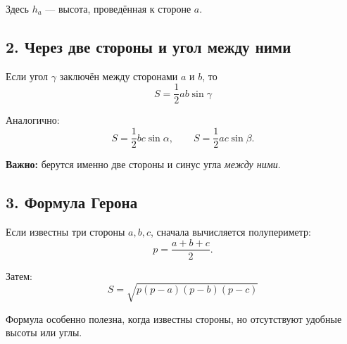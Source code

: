 \documentclass[a4paper,12pt]{article}
\newcommand{\key}[1]{\textcolor{darkaccent}{\textbf{#1}}}
\begin{document}
Здесь \(h_a\) --- высота, проведённая к стороне \(a\).

\begin{center}
\end{center}


\subsection*{2. Через две стороны и угол между ними}

Если угол \(\gamma\) заключён между сторонами \(a\) и \(b\), то
\[
\boxed{
S=\frac12 ab\sin\gamma
}
\]

Аналогично:
\[
S=\frac12 bc\sin\alpha,
\qquad
S=\frac12 ac\sin\beta.
\]

\key{Важно:} берутся именно две стороны и синус угла \emph{между ними}.


\subsection*{3. Формула Герона}

Если известны три стороны \(a,b,c\), сначала вычисляется полупериметр:
\[
p=\frac{a+b+c}{2}.
\]

Затем:
\[
\boxed{
S=\sqrt{p(p-a)(p-b)(p-c)}
}
\]

Формула особенно полезна, когда известны стороны, но отсутствуют удобные высоты или углы.

\end{document}
